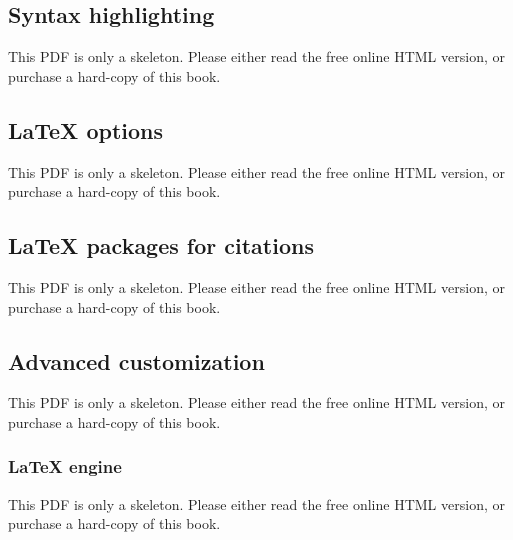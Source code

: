 \documentclass[
  11pt,
]{krantz}
\theoremstyle{definition}
\theoremstyle{definition}
\theoremstyle{definition}
\theoremstyle{definition}
\theoremstyle{remark}
\begin{document}
\begin{table}\caption{\label{tab:df-print-pdf} The possible values of the \texttt{df\_print} option for the \texttt{pdf\_document} format.}\end{table}

\subsection{Syntax highlighting}\label{syntax-highlighting}

This PDF is only a skeleton. Please either read the free online HTML version, or purchase a hard-copy of this book.

\subsection{LaTeX options}\label{latex-options}

This PDF is only a skeleton. Please either read the free online HTML version, or purchase a hard-copy of this book.

\begin{table}\caption{\label{tab:latex-vars} Available top-level YAML metadata variables for LaTeX output.}\end{table}

\subsection{LaTeX packages for citations}\label{latex-packages-for-citations}

This PDF is only a skeleton. Please either read the free online HTML version, or purchase a hard-copy of this book.

\subsection{Advanced customization}\label{advanced-customization-1}

This PDF is only a skeleton. Please either read the free online HTML version, or purchase a hard-copy of this book.

\subsubsection{LaTeX engine}\label{latex-engine}

This PDF is only a skeleton. Please either read the free online HTML version, or purchase a hard-copy of this book.
\end{document}
